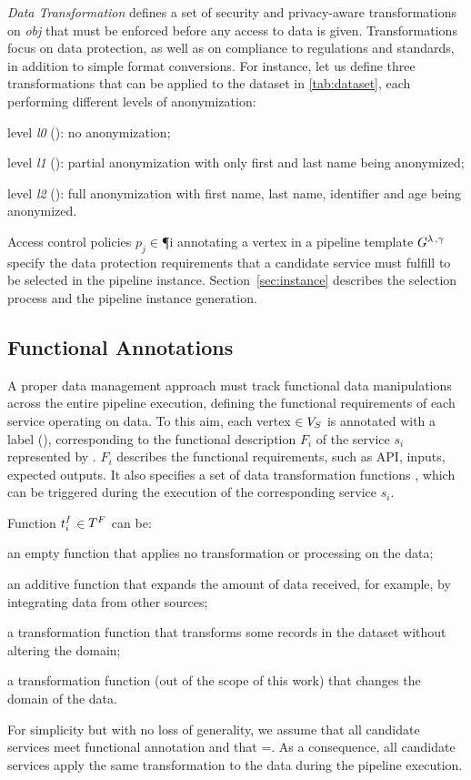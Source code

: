       \textit{Data Transformation \TP} defines a set of security and privacy-aware transformations on \textit{obj} that must be enforced before any access to data is given. Transformations focus on data protection, as well as on compliance to regulations and standards, in addition to simple format conversions. For instance, let us define three transformations that can be applied to the dataset in \cref{tab:dataset}, each performing different levels of anonymization:
      \begin{enumerate*}[label=\roman*)]
        \item level \emph{l0} (): no anonymization;
        \item level \emph{l1} (): partial anonymization with only first and last name being anonymized;
        \item level \emph{l2} (): full anonymization with first name, last name, identifier and age being anonymized.
      \end{enumerate*}

Access control policies $p_j$$\in$\P{i} annotating a vertex  in a pipeline template $G^{\lambda\,,\gamma\,}$ specify the data protection requirements that a candidate service must fulfill to be selected in the pipeline instance. Section~\ref{sec:instance} describes the selection process and the pipeline instance generation.

\subsection{Functional Annotations}\label{sec:funcannotation}
A proper data management approach must track functional data manipulations across the entire pipeline execution, defining the functional requirements of each service operating on data.
To this aim, each vertex $\in V_S$ is annotated with a label \myGamma(), corresponding to the functional description $F_i$ of the service $s_i$ represented by .
$F_i$ describes the functional requirements, such as API, inputs, expected outputs.
It also specifies a set \TF{} of data transformation functions , which can be triggered during the execution of the corresponding service $s_i$.

Function $t^f_{i}$$\in$$T^F_{}$ can be:
\begin{enumerate*}[label=\textit{\roman*})]
  \item an empty function \tf{\epsilon} that applies no transformation or processing on the data;
  \item an additive function  that expands the amount of data received, for example, by integrating data from other sources;
  \item a transformation function  that transforms some records in the dataset without altering the domain;
  \item a transformation function  (out of the scope of this work) that changes the domain of the data.
\end{enumerate*}

For simplicity but with no loss of generality, we assume that all candidate services meet functional annotation \F{} and that \TF{}=\tf{}. As a consequence, all candidate services apply the same transformation to the data during the pipeline execution.